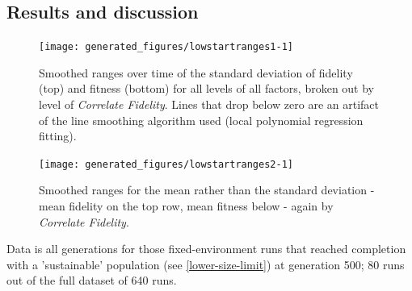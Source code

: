 \subsection{Results and discussion}

\begin{knitrout}
\color{fgcolor}\begin{figure}[htp]
\texttt{[image: generated\_figures/lowstartranges1-1]} \caption[Smoothed ranges over time of the standard deviation of fidelity (top) and fitness (bottom) for all levels of all factors, broken out by level of \emph{Correlate Fidelity}]{Smoothed ranges over time of the standard deviation of fidelity (top) and fitness (bottom) for all levels of all factors, broken out by level of \emph{Correlate Fidelity}. Lines that drop below zero are an artifact of the line smoothing algorithm used (local polynomial regression fitting).}\label{fig:lowstartranges1}
\end{figure}


\end{knitrout}

\begin{knitrout}
\color{fgcolor}\begin{figure}[htp]
\texttt{[image: generated\_figures/lowstartranges2-1]} \caption[Smoothed ranges for the mean rather than the standard deviation - mean fidelity on the top row, mean fitness below - again by \emph{Correlate Fidelity}]{Smoothed ranges for the mean rather than the standard deviation - mean fidelity on the top row, mean fitness below - again by \emph{Correlate Fidelity}.}\label{fig:lowstartranges2}
\end{figure}


\end{knitrout}

Data is all generations for those fixed-environment runs that reached completion with a 'sustainable' population (see \cref{lower-size-limit}) at generation 500; 80 runs out of the full dataset of 640 runs.



